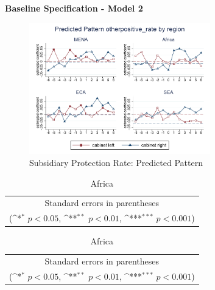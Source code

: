 \documentclass[10pt,a4paper]{scrartcl}
\begin{document}
\clearpage
\textbf{Baseline Specification - Model 2}

\begin{figure}[!ht]
	\centering
	\includegraphics[width=0.7\textwidth]{figures_edited/otherpositive_rate_graph2_by_region.pdf}
	\caption{Subsidiary Protection Rate: Predicted Pattern}
\end{figure}

\begin{table}[!ht]\centering
	\footnotesize
	\renewcommand{\arraystretch}{1.1}
	\def\sym#1{\ifmmode^{#1}\else\(^{#1}\)\fi}
	\caption{Subsidiary Protection Rate: Predicted Pattern}
	\begin{subtable}{.5\linewidth}
		\centering
		\caption{Middle East and North Africa}
		\begin{tabular}{l*{2}{c}}
			\hline\hline
			
			\hline\hline
			\multicolumn{3}{c}{\footnotesize Standard errors in parentheses} \\
			\multicolumn{3}{c}{\footnotesize (\sym{*} \(p<0.05\), \sym{**} \(p<0.01\), \sym{***} \(p<0.001\))}\\
		\end{tabular}
	\end{subtable}%
	\begin{subtable}{.5\linewidth}
		\centering
		\caption{Africa}
		\begin{tabular}{l*{2}{c}}
			\hline\hline
			
			\hline\hline
			\multicolumn{3}{c}{\footnotesize Standard errors in parentheses} \\
			\multicolumn{3}{c}{\footnotesize (\sym{*} \(p<0.05\), \sym{**} \(p<0.01\), \sym{***} \(p<0.001\))}\\
		\end{tabular}
	\end{subtable}%
\end{table}
\end{document}
